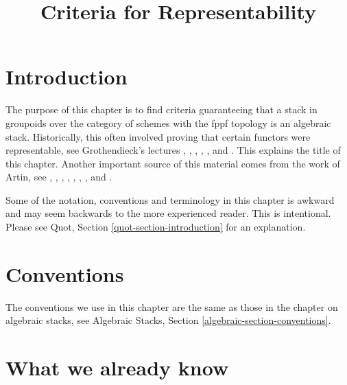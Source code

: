 

%


\title{Criteria for Representability}

\maketitle

\label{section-phantom}

\tableofcontents




\section{Introduction}
\label{section-introduction}

\noindent
The purpose of this chapter is to find criteria guaranteeing that a
stack in groupoids over the category of schemes with the fppf topology
is an algebraic stack. Historically, this often involved proving that
certain functors were representable, see Grothendieck's lectures
\cite{Gr-I},
\cite{Gr-II},
\cite{Gr-III},
\cite{Gr-IV},
\cite{Gr-V}, and
\cite{Gr-VI}.
This explains the title of this chapter. Another important source
of this material comes from the work of Artin, see
\cite{ArtinI},
\cite{ArtinII},
\cite{Artin-Theorem-Representability},
\cite{Artin-Construction-Techniques},
\cite{Artin-Algebraic-Spaces},
\cite{Artin-Algebraic-Approximation},
\cite{Artin-Implicit-Function}, and
\cite{ArtinVersal}.

\medskip\noindent
Some of the notation, conventions and terminology in this chapter is awkward
and may seem backwards to the more experienced reader. This is intentional.
Please see Quot, Section \ref{quot-section-introduction} for an
explanation.



\section{Conventions}
\label{section-conventions}

\noindent
The conventions we use in this chapter are the same as those in the
chapter on algebraic stacks, see
Algebraic Stacks, Section \ref{algebraic-section-conventions}.




\section{What we already know}
\label{section-done-so-far}

